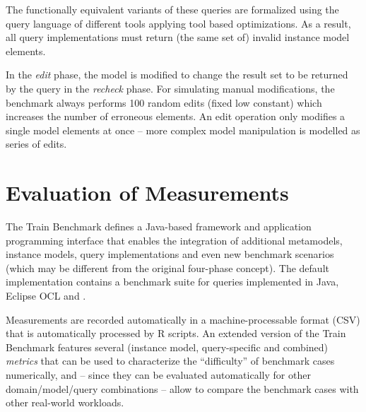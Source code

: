 The functionally equivalent variants of these queries are formalized using the
query language of different tools applying tool based optimizations. As a
result, all query implementations must return (the same set of) invalid instance
model elements.
 
In the \emph{edit} phase, the model is modified to change the result set to be
returned by the query in the \emph{recheck} phase. For simulating manual
modifications, the benchmark always performs 100 random edits (fixed low
constant) which increases the number of erroneous elements. An edit operation
only modifies a single model elements at once  -- more complex model manipulation is
modelled as series of edits.

\section{Evaluation of Measurements}
The Train Benchmark defines a Java-based framework and application programming
interface that enables the integration of additional metamodels, instance
models, query implementations and even new benchmark scenarios (which may be
different from the original four-phase concept). The default implementation
contains a benchmark suite for queries implemented in Java, Eclipse OCL and
\incquery{}.

Measurements are recorded automatically in a machine-processable format (CSV)
that is automatically processed by R \cite{TB:R} scripts. An extended version of the Train
Benchmark \cite{TB:ASE2013} features several (instance model, query-specific and
combined) \emph{metrics} that can be used to characterize the ``difficulty'' of
benchmark cases numerically, and -- since they can be evaluated automatically
for other domain/model/query combinations -- allow to compare the benchmark
cases with other real-world workloads.
